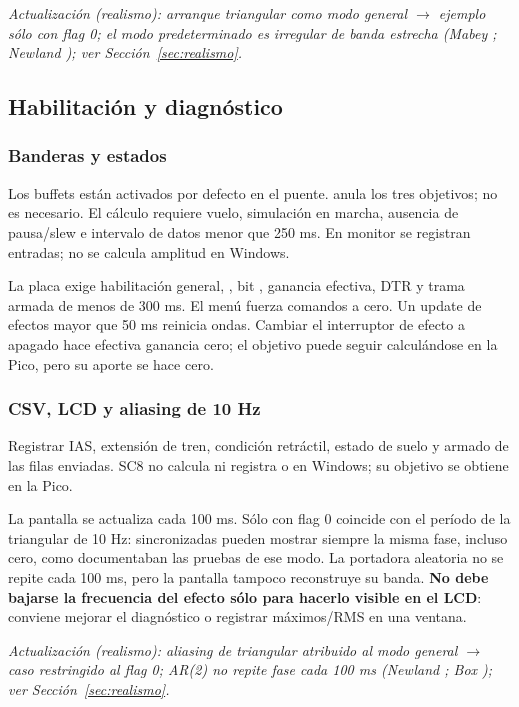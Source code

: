 \textit{Actualización (realismo): arranque triangular como modo general $\rightarrow$ ejemplo sólo con flag 0; el modo predeterminado es irregular de banda estrecha (Mabey \cite{mabey1988}; Newland \cite{newland1993}); ver Sección~\ref{sec:realismo}.}

\subsection{Habilitación y diagnóstico}
\subsubsection{Banderas y estados}
Los buffets están activados por defecto en el puente.  anula los tres objetivos;  no es necesario. El cálculo requiere vuelo, simulación en marcha, ausencia de pausa/slew e intervalo de datos menor que 250 ms. En monitor se registran entradas; no se calcula amplitud en Windows.

La placa exige habilitación general, , bit , ganancia efectiva, DTR y trama armada de menos de 300 ms. El menú fuerza comandos a cero. Un update de efectos mayor que 50 ms reinicia ondas. Cambiar el interruptor de efecto a apagado hace efectiva ganancia cero; el objetivo puede seguir calculándose en la Pico, pero su aporte se hace cero.

\subsubsection{CSV, LCD y aliasing de 10 Hz}
Registrar IAS, extensión de tren, condición retráctil, estado de suelo y armado de las filas enviadas. SC8 no calcula ni registra  o  en Windows; su objetivo se obtiene en la Pico.

La pantalla se actualiza cada 100 ms. Sólo con flag 0 coincide con el período de la triangular de 10 Hz: sincronizadas pueden mostrar siempre la misma fase, incluso cero, como documentaban las pruebas de ese modo. La portadora aleatoria no se repite cada 100 ms, pero la pantalla tampoco reconstruye su banda. \textbf{No debe bajarse la frecuencia del efecto sólo para hacerlo visible en el LCD}: conviene mejorar el diagnóstico o registrar máximos/RMS en una ventana.

\textit{Actualización (realismo): aliasing de triangular atribuido al modo general $\rightarrow$ caso restringido al flag 0; AR(2) no repite fase cada 100 ms (Newland \cite{newland1993}; Box \cite{box}); ver Sección~\ref{sec:realismo}.}

